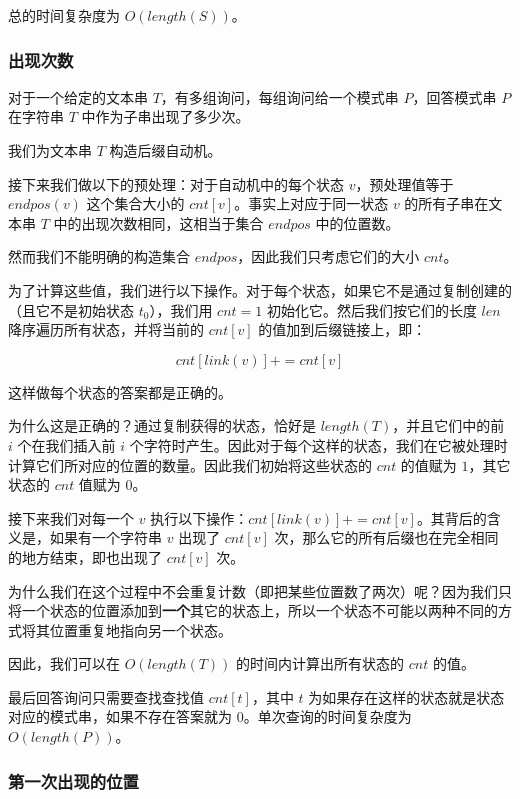 总的时间复杂度为 $O(length(S))$。

\subsubsection{出现次数}

\begin{QUOTE}{}{}
对于一个给定的文本串 $T$，有多组询问，每组询问给一个模式串 $P$，回答模式串 $P$ 在字符串 $T$ 中作为子串出现了多少次。
\end{QUOTE}

我们为文本串 $T$ 构造后缀自动机。

接下来我们做以下的预处理：对于自动机中的每个状态 $v$，预处理值等于 $endpos(v)$ 这个集合大小的 $cnt[v]$。事实上对应于同一状态 $v$ 的所有子串在文本串 $T$ 中的出现次数相同，这相当于集合 $endpos$ 中的位置数。

然而我们不能明确的构造集合 $endpos$，因此我们只考虑它们的大小 $cnt$。

为了计算这些值，我们进行以下操作。对于每个状态，如果它不是通过复制创建的（且它不是初始状态 $t_0$），我们用 $cnt=1$ 初始化它。然后我们按它们的长度 $len$ 降序遍历所有状态，并将当前的 $cnt[v]$ 的值加到后缀链接上，即：

$$
cnt[link(v)]+=cnt[v]
$$

这样做每个状态的答案都是正确的。

为什么这是正确的？通过复制获得的状态，恰好是 $length(T)$，并且它们中的前 $i$ 个在我们插入前 $i$ 个字符时产生。因此对于每个这样的状态，我们在它被处理时计算它们所对应的位置的数量。因此我们初始将这些状态的 $cnt$ 的值赋为 $1$，其它状态的 $cnt$ 值赋为 $0$。

接下来我们对每一个 $v$ 执行以下操作：$cnt[link(v)]+=cnt[v]$。其背后的含义是，如果有一个字符串 $v$ 出现了 $cnt[v]$ 次，那么它的所有后缀也在完全相同的地方结束，即也出现了 $cnt[v]$ 次。

为什么我们在这个过程中不会重复计数（即把某些位置数了两次）呢？因为我们只将一个状态的位置添加到\textbf{一个}其它的状态上，所以一个状态不可能以两种不同的方式将其位置重复地指向另一个状态。

因此，我们可以在 $O(length(T))$ 的时间内计算出所有状态的 $cnt$ 的值。

最后回答询问只需要查找查找值 $cnt[t]$，其中 $t$ 为如果存在这样的状态就是状态对应的模式串，如果不存在答案就为 $0$。单次查询的时间复杂度为 $O(length(P))$。

\subsubsection{第一次出现的位置}

